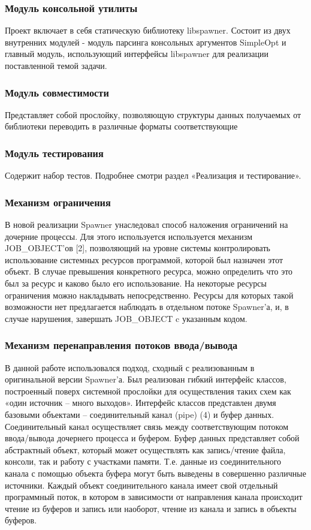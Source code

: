 \documentclass{imcs}
\begin{document}
\subsubsection{Модуль консольной утилиты}

Проект включает в себя статическую библиотеку libspawner.
Состоит из двух внутренних модулей - модуль парсинга консольных аргументов SimpleOpt и главный модуль, использующий интерфейсы libspawner для реализации поставленной темой задачи.

\subsubsection{Модуль совместимости}
Представляет собой прослойку, позволяющую структуры данных получаемых от библиотеки переводить в различные форматы соответствующие 
\subsubsection{Модуль тестирования}
Содержит набор тестов. Подробнее смотри раздел «Реализация и тестирование».
\subsubsection{Механизм ограничения}
В новой реализации Spawner унаследовал способ наложения ограничений на дочерние процессы. Для этого используется используется механизм JOB\_OBJECT'ов [2], позволяющий на уровне системы контролировать использование системных ресурсов программой, которой был назначен этот объект. В случае превышения конкретного ресурса, можно определить что это был за ресурс и каково было его использование. На некоторые ресурсы ограничения можно накладывать непосредственно. Ресурсы для которых такой возможности нет предлагается наблюдать в отдельном потоке Spawner'а, и, в случае нарушения, завершать JOB\_OBJECT c указанным кодом.

\subsubsection{Механизм перенаправления потоков ввода/вывода}
В данной работе использовался подход, сходный с реализованным в оригинальной версии Spawner'а. Был реализован гибкий интерфейс классов, построенный поверх системной прослойки для осуществления таких схем как «один  источник – много выходов». Интерфейс классов представлен двумя базовыми объектами – соединительный канал (pipe) (4) и буфер данных. Соединительный канал осуществляет связь между соответствующим потоком ввода/вывода дочернего процесса и буфером. Буфер данных представляет собой абстрактный объект, который может осуществлять как запись/чтение файла, консоли, так и работу с участками памяти. Т.е. данные из соединительного канала с помощью объекта буфера могут быть выведены в совершенно различные источники. Каждый объект соединительного канала имеет свой отдельный программный поток, в котором в зависимости от направления канала происходит чтение из буферов и запись или наоборот, чтение из канала и запись в объекты буферов.
\end{document}

